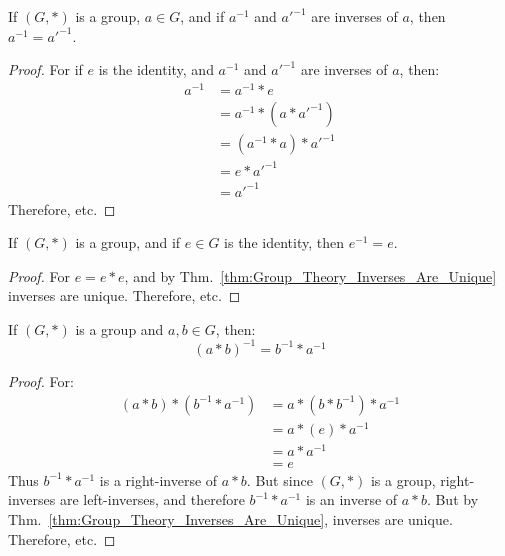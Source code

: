         \begin{theorem}
            \label{thm:Group_Theory_Inverses_Are_Unique}
            If $(G,*)$ is a group, $a\in{G}$, and if $a^{-1}$ and
            $a'^{-1}$ are inverses of $a$, then $a^{-1}=a'^{-1}$.
        \end{theorem}
        \begin{proof}
            For if $e$ is the identity, and
            $a^{-1}$ and $a'^{-1}$ are inverses of $a$, then:
            \begin{align}
                a^{-1}&=a^{-1}*e
                \tag{Identitive Property}\\
                &=a^{-1}*(a*a'^{-1})
                \tag{Inverse Property}\\
                &=(a^{-1}*a)*a'^{-1}
                \tag{Associative Property}\\
                &=e*a'^{-1}
                \tag{Inverse Property}\\
                &=a'^{-1}
                \tag{Identitive Property}
            \end{align}
            Therefore, etc.
        \end{proof}
        \begin{theorem}
            If $(G,*)$ is a group, and if $e\in{G}$ is the identity,
            then $e^{-1}=e$.
        \end{theorem}
        \begin{proof}
            For $e=e*e$, and by Thm.~\ref{thm:Group_Theory_Inverses_Are_Unique}
            inverses are unique. Therefore, etc.
        \end{proof}
        \begin{theorem}
            \label{thm:Group_Theory_Inverse_of_Product}
            If $(G,*)$ is a group and $a,b\in G$, then:
            \begin{equation}
                (a*b)^{-1} = b^{-1}*a^{-1}
            \end{equation}
        \end{theorem}
        \begin{proof}
            For:
            \begin{align}
                (a*b)*(b^{-1}*a^{-1})&=
                a*(b*b^{-1})*a^{-1}
                \tag{Associative Property}\\
                &=a*(e)*a^{-1}
                \tag{Inverse Property}\\
                &=a*a^{-1}
                \tag{Identitive Property}\\
                &=e
                \tag{Inverse Property}
            \end{align}
            Thus $b^{-1}*a^{-1}$ is a right-inverse of $a*b$.
            But since $(G,*)$ is a group, right-inverses are
            left-inverses, and therefore $b^{-1}*a^{-1}$ is
            an inverse of $a*b$. But by
            Thm.~\ref{thm:Group_Theory_Inverses_Are_Unique},
            inverses are unique. Therefore, etc.
        \end{proof}
